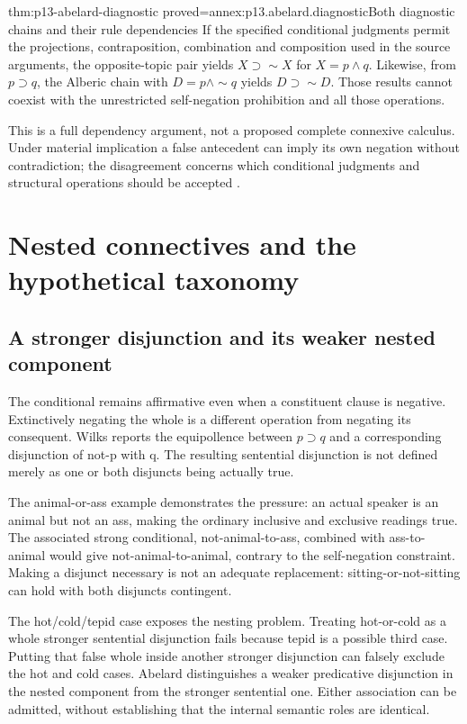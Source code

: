 \begin{hblemma}{thm:p13-abelard-diagnostic}
 {proved=annex:p13.abelard.diagnostic}{Both diagnostic chains and their rule dependencies}
If the specified conditional judgments permit the projections,
contraposition, combination and composition used in the
source arguments, the opposite-topic pair yields
\(X\supset\sim X\) for \(X=p\land q\).
Likewise, from \(p\supset q\), the Alberic chain with
\(D=p\land\sim q\) yields \(D\supset\sim D\).
Those results cannot coexist with the unrestricted
self-negation prohibition and all those operations.
\end{hblemma}

This is a full dependency argument, not a proposed complete
connexive calculus. Under material implication a false
antecedent can imply its own negation without contradiction;
the disagreement concerns which conditional judgments and
structural operations should be accepted
\cite[pp.~132--134]{Wilks2007FordhamAbelard}.

\section{Nested connectives and the hypothetical taxonomy}
\label{sec:p13-abelard-nesting}

\subsection{A stronger disjunction and its weaker nested component}

The conditional remains affirmative even when a constituent
clause is negative. Extinctively negating the whole is a
different operation from negating its consequent.
Wilks reports the equipollence between \(p\supset q\)
and a corresponding disjunction of not-p with q.
The resulting sentential disjunction is not defined merely
as one or both disjuncts being actually true.

The animal-or-ass example demonstrates the pressure:
an actual speaker is an animal but not an ass, making the
ordinary inclusive and exclusive readings true.
The associated strong conditional, not-animal-to-ass,
combined with ass-to-animal would give not-animal-to-animal,
contrary to the self-negation constraint.
Making a disjunct necessary is not an adequate replacement:
sitting-or-not-sitting can hold with both disjuncts contingent.

The hot/cold/tepid case exposes the nesting problem.
Treating hot-or-cold as a whole stronger sentential
disjunction fails because tepid is a possible third case.
Putting that false whole inside another stronger disjunction
can falsely exclude the hot and cold cases.
Abelard distinguishes a weaker predicative disjunction in
the nested component from the stronger sentential one.
Either association can be admitted, without establishing
that the internal semantic roles are identical.

